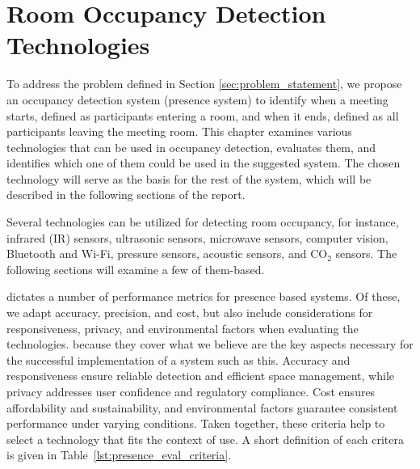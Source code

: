 \chapter{Room Occupancy Detection Technologies}\label{chap:presence_intro}
To address the problem defined in Section \ref{sec:problem_statement}, we propose an occupancy detection system (presence system) to identify when a meeting starts, defined as participants entering a room, and when it ends, defined as all participants leaving the meeting room.
This chapter examines various technologies that can be used in occupancy detection, evaluates them, and identifies which one of them could be used in the suggested system.
The chosen technology will serve as the basis for the rest of the system, which will be described in the following sections of the report.

Several technologies can be utilized for detecting room occupancy, for instance, infrared (IR) sensors\cite{woodward-2021, dodierBuildingOccupancyDetection2006, OccupancySensorMotion}, ultrasonic sensors\cite{woodward-2021, dodierBuildingOccupancyDetection2006, OccupancySensorMotion}, microwave sensors\cite{woodward-2021}, computer vision\cite{co2sensor, longoAccurateOccupancyEstimation2019, OccupancySensorMotion}, Bluetooth and Wi-Fi\cite{longoAccurateOccupancyEstimation2019}, pressure sensors\cite{OccupancySensorMotion}, acoustic sensors\cite{OccupancySensorMotion}, and $\text{CO}_{2}$ sensors\cite{co2sensor, longoAccurateOccupancyEstimation2019, jinSensingProxyOccupancy2015}.\cite{faragherLocationFingerprintingBluetooth2015}
The following sections will examine a few of them-based.

\citeauthor{presence_ble_review} \cite{presence_ble_review} dictates a number of performance metrics for presence based systems. Of these, we adapt accuracy, precision, and cost, but also include considerations for responsiveness, privacy, and environmental factors when evaluating the technologies.
because they cover what we believe are the key aspects necessary for the successful implementation of a system such as this.
Accuracy and responsiveness ensure reliable detection and efficient space management, while privacy addresses user confidence and regulatory compliance.
Cost ensures affordability and sustainability, and environmental factors guarantee consistent performance under varying conditions.
Taken together, these criteria help to select a technology that fits the context of use.
A short definition of each critera is given in Table~\ref{lst:presence_eval_criteria}.



